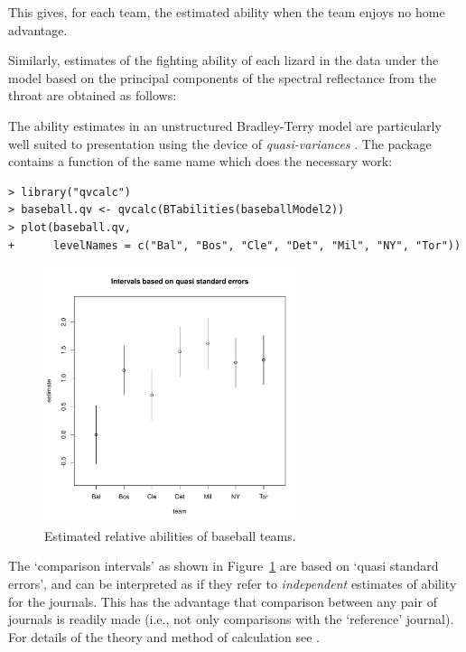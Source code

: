 This gives, for each team, the estimated ability when the team
enjoys no home advantage.

Similarly, estimates of the fighting ability of each lizard in the
 data under the model based on the principal components
of the spectral reflectance from the throat are obtained as follows:

\Rcodeplaceholder{}

%
The ability estimates in an unstructured Bradley-Terry model are
particularly well suited to presentation using the device of
\emph{quasi-variances} \citep{firt:04}.  The 
package \citep[][version 0.8-5 or later]{firt:10} contains a function of the same name
which does the necessary work:
\begin{verbatim}
> library("qvcalc")
> baseball.qv <- qvcalc(BTabilities(baseballModel2))
> plot(baseball.qv,
+      levelNames = c("Bal", "Bos", "Cle", "Det", "Mil", "NY", "Tor"))
\end{verbatim}
%
\begin{figure}[t!]
    \centering
        \includegraphics[width=0.67\textwidth]{baseball-qvplot.pdf}
    \caption{Estimated relative abilities of baseball teams.\label{fig:qvplot}}
\end{figure}
%
The `comparison intervals' as shown in Figure~\ref{fig:qvplot} are based on
`quasi standard errors', and can be interpreted as if they refer to
\emph{independent} estimates of ability for the journals.  This has the
advantage that comparison between any pair of journals is readily made
(i.e., not only comparisons with the `reference' journal).  For details
of the theory and method of calculation see \citet{firt:04}.

